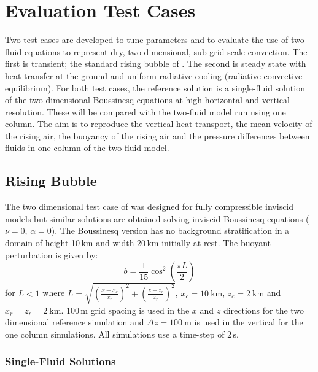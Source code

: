 \documentclass[draft]{agujournal2019}
\begin{document}
\section{\label{sec:results}Evaluation Test Cases}

Two test cases are developed to tune parameters and to evaluate the
use of two-fluid equations to represent dry, two-dimensional, sub-grid-scale
convection. The first is transient; the standard rising bubble of
.  The second  is steady state with heat transfer at
the ground and uniform radiative cooling (radiative convective equilibrium). For both test cases, the
reference solution is a single-fluid solution of the two-dimensional
Boussinesq equations at high horizontal and vertical resolution. These will be compared with the two-fluid model run using one column. The aim is to reproduce the vertical heat transport, the mean velocity of the rising air, the buoyancy of the rising air and the pressure differences between fluids in one column of the two-fluid model.

\subsection{Rising Bubble}

The two dimensional test case of  was designed for fully compressible
inviscid models but similar solutions are obtained solving inviscid Boussinesq equations ($\nu=0$, $\alpha=0$).
The Boussinesq version has no background stratification in a domain
of height 10\,km and width 20\,km initially at rest. The buoyant
perturbation is given by:
\begin{equation}
b=\frac{1}{15}\cos^{2}\left(\frac{\pi L}{2}\right)\label{eq:thetaPerturb}
\end{equation}
for $L<1$ where $L=\sqrt{\left(\frac{x-x_{c}}{x_{r}}\right)^{2}+\left(\frac{z-z_{c}}{z_{r}}\right)^{2}}$,
$x_{c}=10\ \text{km}$, $z_{c}=2\ \text{km}$ and $x_{r}=z_{r}=2\ \text{km}$.
100\,m grid spacing is used in the $x$ and $z$ directions for the
two dimensional reference simulation and $\Delta z=100\ \text{m}$
is used in the vertical for the one column simulations. All simulations
use a time-step of 2\,s.

\subsubsection{Single-Fluid Solutions}
\end{document}
